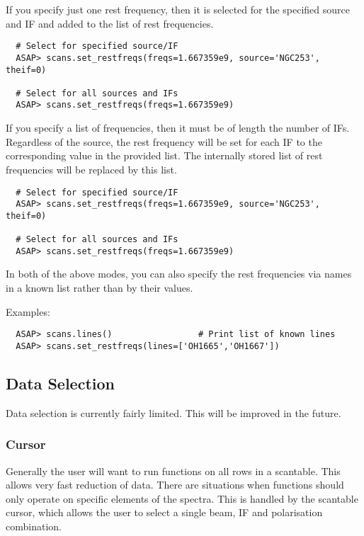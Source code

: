 \documentclass[11pt]{article}
\begin{document}
If you specify just one rest frequency, then it is selected for the
specified source and IF and added to the list of rest frequencies.

\begin{verbatim}
  # Select for specified source/IF
  ASAP> scans.set_restfreqs(freqs=1.667359e9, source='NGC253', theif=0)   

  # Select for all sources and IFs
  ASAP> scans.set_restfreqs(freqs=1.667359e9)                             
\end{verbatim}


If you specify a list of frequencies, then it must be of length the
number of IFs.  Regardless of the source, the rest frequency will be set
for each IF to the corresponding value in the provided list.  The
internally stored list of rest frequencies will be replaced by this
list.


\begin{verbatim}
  # Select for specified source/IF
  ASAP> scans.set_restfreqs(freqs=1.667359e9, source='NGC253', theif=0)   

  # Select for all sources and IFs
  ASAP> scans.set_restfreqs(freqs=1.667359e9)                             
\end{verbatim}


In both of the above modes, you can also specify the rest frequencies via
names in a known list rather than by their values.

Examples:

\begin{verbatim}
  ASAP> scans.lines()                 # Print list of known lines
  ASAP> scans.set_restfreqs(lines=['OH1665','OH1667'])
\end{verbatim}

  

\subsection{Data Selection}

Data selection is currently fairly limited. This will be improved in
the future. 


\subsubsection{Cursor}

Generally the user will want to run functions on all rows in a
scantable. This allows very fast reduction of data. There are situations
when functions should only operate on specific elements of the spectra. This
is handled by the scantable cursor, which allows the user to select a
single beam, IF and polarisation combination.
\end{document}
